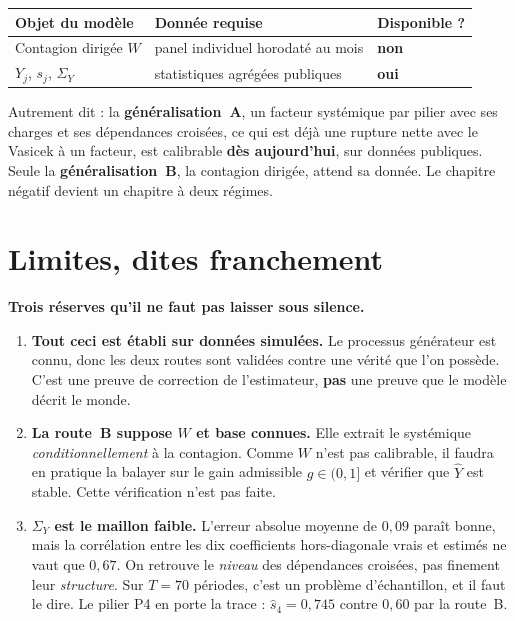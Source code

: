 \documentclass[11pt,a4paper]{article}
\newcommand{\Y}{Y}
\begin{document}
\begin{center}
\small
\begin{tabular}{lll}
\toprule
\textbf{Objet du modèle} & \textbf{Donnée requise} & \textbf{Disponible ?} \\
\midrule
Contagion dirigée $W$          & panel individuel horodaté au mois & \textbf{non} \\
$\Y_j$, $s_j$, $\Sigma_Y$      & statistiques agrégées publiques   & \textbf{oui} \\
\bottomrule
\end{tabular}
\end{center}

\medskip
\noindent
Autrement dit : la \textbf{généralisation~A}, un facteur systémique par pilier avec ses
charges et ses dépendances croisées, ce qui est déjà une rupture nette avec le Vasicek à un
facteur, est calibrable \textbf{dès aujourd'hui}, sur données publiques. Seule la
\textbf{généralisation~B}, la contagion dirigée, attend sa donnée. Le chapitre négatif
devient un chapitre à deux régimes.

\section{Limites, dites franchement}

\begin{attention}
\textbf{Trois réserves qu'il ne faut pas laisser sous silence.}
\begin{enumerate}[leftmargin=1.6em,itemsep=2pt]
\item \textbf{Tout ceci est établi sur données simulées.} Le processus générateur est connu,
donc les deux routes sont validées contre une vérité que l'on possède. C'est une preuve de
correction de l'estimateur, \textbf{pas} une preuve que le modèle décrit le monde.
\item \textbf{La route~B suppose $W$ et base connues.} Elle extrait le systémique
\emph{conditionnellement} à la contagion. Comme $W$ n'est pas calibrable, il faudra en
pratique la balayer sur le gain admissible $g \in (0,1]$ et vérifier que $\hat{\Y}$ est stable.
Cette vérification n'est pas faite.
\item \textbf{$\Sigma_Y$ est le maillon faible.} L'erreur absolue moyenne de $0{,}09$ paraît
bonne, mais la corrélation entre les dix coefficients hors-diagonale vrais et estimés ne vaut
que $0{,}67$. On retrouve le \emph{niveau} des dépendances croisées, pas finement leur
\emph{structure}. Sur $T = 70$ périodes, c'est un problème d'échantillon, et il faut le dire.
Le pilier P4 en porte la trace : $\hat{s}_4 = 0{,}745$ contre $0{,}60$ par la route~B.
\end{enumerate}
\end{attention}
\end{document}
